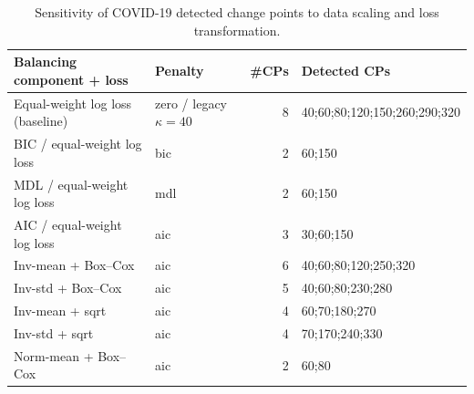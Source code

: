 \documentclass[10pt,letterpaper]{article}
\begin{document}
\begin{table}[h!]
\small
\centering
\begin{tabular}{|l|l|r|l|}
\hline
\textbf{Balancing component + loss} & \textbf{Penalty} & \textbf{\#CPs} & \textbf{Detected CPs} \\
\hline
Equal-weight log loss (baseline) & zero / legacy $\kappa=40$ & 8 & 40;60;80;120;150;260;290;320 \\
\hline
BIC / equal-weight log loss & bic & 2 & 60;150 \\
\hline
MDL / equal-weight log loss & mdl & 2 & 60;150 \\
\hline
AIC / equal-weight log loss & aic & 3 & 30;60;150 \\
\hline
Inv-mean + Box--Cox & aic & 6 & 40;60;80;120;250;320 \\
\hline
Inv-std + Box--Cox & aic & 5 & 40;60;80;230;280 \\
\hline
Inv-mean + sqrt & aic & 4 & 60;70;180;270 \\
\hline
Inv-std + sqrt & aic & 4 & 70;170;240;330 \\
\hline
Norm-mean + Box--Cox & aic & 2 & 60;80 \\
\hline
\end{tabular}
\caption{Sensitivity of COVID-19 detected change points to data scaling and loss transformation.}
\label{tab:covid_sensitivity}
\end{table}
\end{document}
